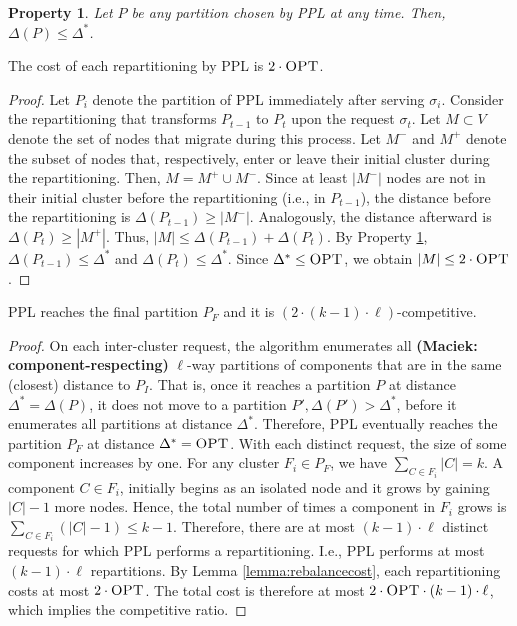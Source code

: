 \documentclass[a4paper,anonymous,USenglish]{lipics-v2019}
\newcommand{\OPT}{\textsc{OPT}\xspace}
\newcommand{\PPL}{\textsc{PPL}\xspace}
\newtheorem{property}{Property}
\newcommand\maciek[1]{\color{brown}\textbf{(Maciek: #1)}\color{black}}
\begin{document}
\begin{property} \label{prop:dist<OPT}
	Let $P$ be any partition chosen by \PPL at any time.
	Then, $\Delta(P) \leq \Delta^*$.	
\end{property}

\begin{lemma}	\label{lemma:rebalancecost}
	The cost of each repartitioning by \PPL is $2\cdot\OPT$.
\end{lemma}
\begin{proof}
	Let $P_i$ denote the partition of \PPL immediately after serving $\sigma_{i}$.
	Consider the repartitioning that transforms 
	$P_{t-1}$ to $P_t$ upon the request $\sigma_t$.
	Let $M \subset V$ denote the set of nodes that migrate during this process.
	Let $M^-$ and $M^+$ denote the subset of nodes that, respectively,
	enter or leave their initial cluster during the repartitioning.    
	Then,
	$M = M^+ \cup M^-$.
	Since at least $|M^-|$ nodes are not in their initial cluster before the repartitioning (i.e., in $P_{t-1}$),
	the distance before the repartitioning is $\Delta(P_{t-1}) \geq | M^-|$.
	Analogously,
	the distance afterward is $\Delta(P_{t}) \geq | M^+|$.
	Thus,
	$|M| \leq \Delta(P_{t-1}) + \Delta(P_{t})$.
	By Property \ref{prop:dist<OPT},
	$\Delta(P_{t-1})  \leq \Delta^*$ and
	$\Delta(P_{t}) \leq \Delta^*$.
	Since $\Delta^* \leq \OPT$,
	we obtain	 $|M| \leq 2\cdot\OPT$.
\end{proof}

\begin{theorem}	\label{thm:upperbound}
	\PPL reaches the final partition $P_F$
	 and it is $(2\cdot (k-1)\cdot\ell)$-competitive.
\end{theorem}
\begin{proof}
	On each inter-cluster request,
	the algorithm enumerates all \maciek{component-respecting} $\ell$-way partitions of components
	that are in the same (closest) distance to $P_I$.
	That is, 
	once it reaches a partition $P$ at distance $\Delta^* = \Delta(P)$,
	it does not move to a partition
	$P', \Delta(P') > \Delta^*$,
	before it enumerates all partitions at distance $\Delta^*$.
	Therefore,
	\PPL eventually reaches  the partition $P_F$ at distance $\Delta^*=\OPT$.
	With each distinct request, 
	the size of some component increases by one.
	For any cluster $F_i \in P_F$,
	we have $\sum_{C \in F_i} |C| = k$.
	A component $C \in F_i$,
	 initially begins as an isolated node and it grows by gaining $|C|-1$ more nodes.
	Hence, the total number of times a component in $F_i$ grows is 
	$\sum_{C \in F_i} (|C|-1) \leq k-1$.
	Therefore, there are at most  $(k-1)\cdot\ell $ distinct requests
	for which \PPL performs a repartitioning.
	I.e.,
	 \PPL performs at most $(k-1)\cdot\ell $ repartitions.
	By Lemma \ref{lemma:rebalancecost},
	each repartitioning costs at most $2\cdot\OPT$.
	The total cost is therefore at most $2\cdot\OPT\cdot (k-1) \cdot\ell$, which implies the competitive ratio.
\end{proof}
\end{document}
